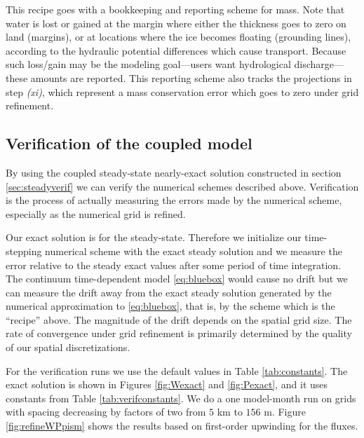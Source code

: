 \documentclass[11pt,final]{amsart}
\begin{document}
\medskip
This recipe goes with a bookkeeping and reporting scheme for mass.  Note that water is lost or gained at the margin where either the thickness goes to zero on land (margins), or at locations where the ice becomes floating (grounding lines), according to the hydraulic potential differences which cause transport.  Because such loss/gain may be the modeling goal---users want hydrological discharge---these amounts are reported.  This reporting scheme also tracks the projections in step \emph{(xi)}, which represent a mass conservation error which goes to zero under grid refinement.

\subsection*{Verification of the coupled model}  By using the coupled steady-state nearly-exact solution constructed in section \ref{sec:steadyverif} we can verify the numerical schemes described above.  Verification is the process of actually measuring the errors made by the numerical scheme, especially as the numerical grid is refined.

Our exact solution is for the steady-state.  Therefore we initialize our time-stepping numerical scheme with the exact steady solution and we measure the error relative to the steady exact values after some period of time integration.  The continuum time-dependent model \eqref{eq:bluebox} would cause no drift but we can measure the drift away from the exact steady solution generated by the numerical approximation to \eqref{eq:bluebox}, that is, by the scheme which is the ``recipe'' above.  The magnitude of the drift depends on the spatial grid size.  The rate of convergence under grid refinement is primarily determined by the quality of our spatial discretizations.

For the verification runs we use the default values in Table \ref{tab:constants}.  The exact solution is shown in Figures \ref{fig:Wexact} and \ref{fig:Pexact}, and it uses constants from Table \ref{tab:verifconstants}.  We do a one model-month run on grids with spacing decreasing by factors of two from $5$ km to $156$ m.  Figure \ref{fig:refineWPpism} shows the results based on first-order upwinding for the fluxes.
\end{document}
